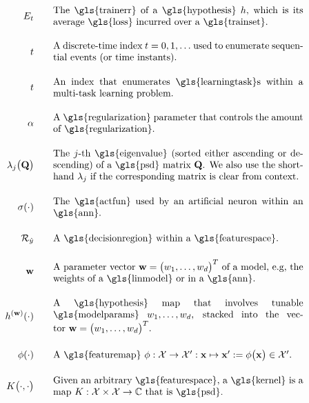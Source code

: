\begin{align}
	\trainerror \quad\quad &\parbox{.75\textwidth}{The \gls{trainerr} of a \gls{hypothesis} $\hypothesis$, which is its 
		average \gls{loss} incurred over a \gls{trainset}. } \nonumber 	\\[4mm] 
	\timeidx \quad\quad &\parbox{.75\textwidth}{A discrete-time index $\timeidx=0,1,\ldots$ used to 
		enumerate sequential events (or time instants). } \nonumber \\[4mm] 
	\taskidx \quad\quad &\parbox{.75\textwidth}{An index that enumerates
		\gls{learningtask}s within a multi-task learning problem.} \nonumber      \\[4mm]     
	\regparam \quad\quad &\parbox{.75\textwidth}{A \gls{regularization} parameter that controls 
		the amount of \gls{regularization}. } \nonumber \\[4mm] 
	\eigval{\featureidx}\big( \mathbf{Q} \big) \quad\quad &\parbox{.75\textwidth}{The $\featureidx$-th 
		\gls{eigenvalue} (sorted either ascending or descending) of a \gls{psd} matrix $\mathbf{Q}$. We also 
		use the shorthand $\eigval{\featureidx}$ if the corresponding matrix is clear from context. } \nonumber \\[4mm] 
	\actfun(\cdot) \quad\quad &\parbox{.75\textwidth}{The \gls{actfun} used by an artificial neuron within an \gls{ann}.} \nonumber    	 \\[4mm]     
	\decreg{\hat{\truelabel}} \quad\quad &\parbox{.75\textwidth}{A \gls{decisionregion} within a \gls{featurespace}.  } \nonumber   \\[4mm]     
	\weights  \quad\quad & \parbox{.75\textwidth}{A parameter vector $\weights = \big(\weight_{1},\ldots,\weight_{\featuredim}\big)^{T}$ 
		of a model, e.g, the weights of a \gls{linmodel} or in a \gls{ann}.}    \nonumber \nonumber  \\[4mm]  
	\hypothesis^{(\weights)}(\cdot)  \quad\quad &\parbox{.75\textwidth}{A \gls{hypothesis} map that involves tunable \gls{modelparams} $\weight_{1},\ldots,\weight_{\featuredim}$, stacked into the vector $\weights=\big(\weight_{1},\ldots,\weight_{\featuredim} \big)^{T}$.} \nonumber    \\[4mm]    
	\featuremap(\cdot)  \quad\quad & \parbox{.75\textwidth}{A \gls{featuremap} $\featuremap: \featurespace \rightarrow \featurespace' : \featurevec \mapsto \featurevec' \defeq \featuremap\big( \featurevec \big) \in \featurespace'$.}    \nonumber    \\[4mm]    
	\kernelmap{\cdot}{\cdot} \quad\quad & \parbox{.75\textwidth}{Given an arbitrary \gls{featurespace}, 
		a \gls{kernel} is a map $\kernel: \featurespace \times \featurespace \rightarrow \mathbb{C}$ that is \gls{psd}.}    \nonumber                                                                                                                                                     
\end{align}              






